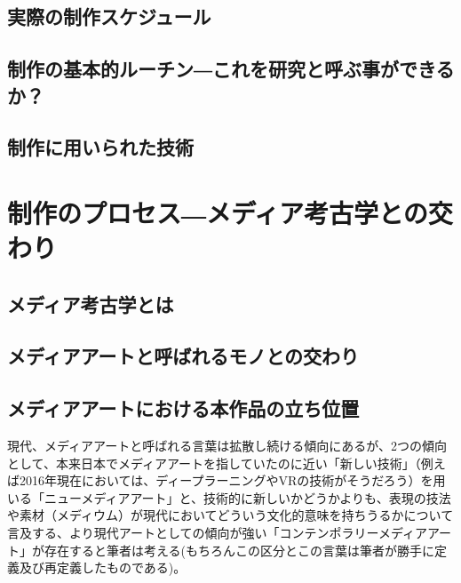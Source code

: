 \section{実際の制作スケジュール}\label{ux5b9fux969bux306eux5236ux4f5cux30b9ux30b1ux30b8ux30e5ux30fcux30eb}

\section{制作の基本的ルーチン―これを研究と呼ぶ事ができるか？}\label{ux5236ux4f5cux306eux57faux672cux7684ux30ebux30fcux30c1ux30f3ux3053ux308cux3092ux7814ux7a76ux3068ux547cux3076ux4e8bux304cux3067ux304dux308bux304b}

\section{制作に用いられた技術}\label{ux5236ux4f5cux306bux7528ux3044ux3089ux308cux305fux6280ux8853}

\chapter{制作のプロセス―メディア考古学との交わり}\label{ux5236ux4f5cux306eux30d7ux30edux30bbux30b9ux30e1ux30c7ux30a3ux30a2ux8003ux53e4ux5b66ux3068ux306eux4ea4ux308fux308a}

\section{メディア考古学とは}\label{ux30e1ux30c7ux30a3ux30a2ux8003ux53e4ux5b66ux3068ux306f}

\section{メディアアートと呼ばれるモノとの交わり}\label{ux30e1ux30c7ux30a3ux30a2ux30a2ux30fcux30c8ux3068ux547cux3070ux308cux308bux30e2ux30ceux3068ux306eux4ea4ux308fux308a}

\section{メディアアートにおける本作品の立ち位置}\label{ux30e1ux30c7ux30a3ux30a2ux30a2ux30fcux30c8ux306bux304aux3051ux308bux672cux4f5cux54c1ux306eux7acbux3061ux4f4dux7f6e}

現代、メディアアートと呼ばれる言葉は拡散し続ける傾向にあるが、2つの傾向として、本来日本でメディアアートを指していたのに近い「新しい技術」（例えば2016年現在においては、ディープラーニングやVRの技術がそうだろう）を用いる「ニューメディアアート」と、技術的に新しいかどうかよりも、表現の技法や素材（メディウム）が現代においてどういう文化的意味を持ちうるかについて言及する、より現代アートとしての傾向が強い「コンテンポラリーメディアアート」が存在すると筆者は考える(もちろんこの区分とこの言葉は筆者が勝手に定義及び再定義したものである)。

